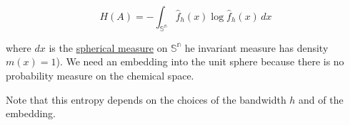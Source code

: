 \[ H(A) = -\int_\mathbb{{S}^n}  \hat{f}_h(x)\log  \hat{f}_h(x) \,dx  \]



where $dx$ is the \href{https://en.wikipedia.org/wiki/Spherical_measure}{spherical measure} on $\mathbb{{S}^n}$ he invariant measure has density $m(x)=1$). We need an embedding into the unit sphere because there is no probability measure on the chemical space.

Note that this entropy depends on the choices of the bandwidth $h$ and of the embedding.

